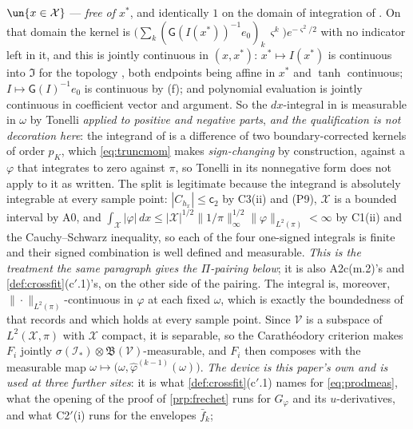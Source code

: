 \begin{enumerate}
$\un\{x\in\mathcal X\}$ --- \emph{free of $x^\ast$}, and identically $1$ on the domain of integration
of . On that domain the kernel is
$\big(\sum_{k}(\mathsf G(I(x^\ast))^{-1}e_0)_k\,\varsigma^{k}\big)e^{-\varsigma^{2}/2}$ with no
indicator left in it, and this is jointly continuous in $(x,x^\ast)$: $x^\ast\mapsto I(x^\ast)$ is
continuous into $\mathfrak I$ for the topology , both endpoints being affine in
$x^\ast$ and $\tanh$ continuous; $I\mapsto\mathsf G(I)^{-1}e_0$ is continuous by
\textup{(f)}; and polynomial evaluation is jointly continuous in coefficient
vector and argument. So the $dx$-integral in  is measurable in $\omega$ by Tonelli
\emph{applied to positive and negative parts}, \emph{and the qualification is not decoration here}: the
integrand of  is a difference of two boundary-corrected kernels of order $p_K$, which
\eqref{eq:truncmom} makes \emph{sign-changing} by construction, against a $\varphi$ that integrates to zero
against $\pi$, so Tonelli in its nonnegative form does not apply to it as written. The split is legitimate
because the integrand is absolutely integrable at every sample point: $|C_{h_x}|\le\mathsf c_2$ by C3(ii)
and \textup{(P9)}, $\mathcal X$ is a bounded interval by A0, and
$\int_{\mathcal X}|\varphi|\,dx\le|\mathcal X|^{1/2}\|1/\pi\|^{1/2}_\infty\|\varphi\|_{L^{2}(\pi)}<\infty$
by C1(ii) and the Cauchy--Schwarz inequality, so each of the four one-signed integrals is finite and their
signed combination is well defined and measurable. \emph{This is the treatment the same paragraph gives the
$\Pi$-pairing below}; it is also
A2c\textup{(m.2)}'s and \cref{def:crossfit}\textup{(c$'$.1)}'s, on the other
side of the pairing. The integral is, moreover,
$\|\cdot\|_{L^{2}(\pi)}$-continuous in $\varphi$ at each fixed $\omega$, which is exactly the boundedness of
 that  records and which holds at every sample point. Since $\mathcal V$
is a subspace of $L^{2}(\mathcal X,\pi)$ with $\mathcal X$ compact, it is separable, so the Carath\'eodory
criterion makes $F_i$ jointly $\sigma(\mathcal I_\ast)\otimes\mathfrak B(\mathcal V)$-measurable, and $F_i$ then
composes with the measurable map $\omega\mapsto\big(\omega,\hat\varphi^{(k-1)}(\omega)\big)$. \emph{The
device is this paper's own and is used at three further sites}: it is what \cref{def:crossfit}\textup{(c$'$.1)} names for
\eqref{eq:prodmeas}, what the opening of the proof of \cref{prp:frechet} runs for $G_\varphi$ and its
$u$-derivatives, and what C2$'$(i) runs for the envelopes $\bar f_k$;

\end{enumerate}
